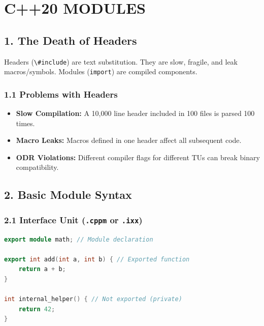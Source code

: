 \hypertarget{c20-modules}{%
\chapter{C++20 MODULES}\label{c20-modules}}

\hypertarget{the-death-of-headers}{%
\section{1. The Death of Headers}\label{the-death-of-headers}}

Headers (\passthrough{\lstinline!\#include!}) are text substitution.
They are slow, fragile, and leak macros/symbols. Modules
(\passthrough{\lstinline!import!}) are compiled components.

\hypertarget{problems-with-headers}{%
\subsection{1.1 Problems with Headers}\label{problems-with-headers}}

\begin{itemize}
\tightlist
\item
  \textbf{Slow Compilation:} A 10,000 line header included in 100 files
  is parsed 100 times.
\item
  \textbf{Macro Leaks:} Macros defined in one header affect all
  subsequent code.
\item
  \textbf{ODR Violations:} Different compiler flags for different TUs
  can break binary compatibility.
\end{itemize}

\hypertarget{basic-module-syntax}{%
\section{2. Basic Module Syntax}\label{basic-module-syntax}}

\hypertarget{interface-unit-.cppm-or-.ixx}{%
\subsection{\texorpdfstring{2.1 Interface Unit (\texttt{.cppm} or
\texttt{.ixx})}{2.1 Interface Unit (.cppm or .ixx)}}\label{interface-unit-.cppm-or-.ixx}}

\begin{lstlisting}[language={C++}]
export module math; // Module declaration

export int add(int a, int b) { // Exported function
    return a + b;
}

int internal_helper() { // Not exported (private)
    return 42;
}
\end{lstlisting}

